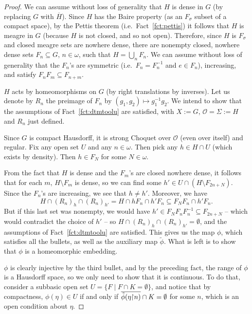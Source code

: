	\begin{proof}
		We can assume without loss of generality that $H$ is dense in $G$ (by replacing $G$ with $\overline H$). Since $H$ has the Baire property (as an $F_\sigma$ subset of a compact space), by the Pettis theorem (i.e.\ Fact~\ref{fct:pettis}) it follows that $H$ is meagre in $G$ (because $H$ is not closed, and so not open). Therefore, since $H$ is $F_\sigma$ and closed meagre sets are nowhere dense, there are nonempty closed, nowhere dense sets $F_n\subseteq G$, $n \in \omega$, such that $H = \bigcup_n F_n$. We can assume without loss of generality that the $F_n$'s are symmetric (i.e.\ $F_n=F_n^{-1}$ and $e \in F_n$), increasing, and satisfy $F_nF_m\subseteq F_{n+m}$.
		
		$H$ acts by homeomorphisms on $G$ (by right translations by inverses). Let us denote by $R_n$ the preimage of $F_n$ by $(g_1,g_2)\mapsto g_1^{-1}g_2$. We intend to show that the assumptions of Fact~\ref{fct:dtmtoolu} are satisfied, with $X:=G$, $\mathcal O=\Sigma:=H$ and $R_n$ just defined.
		
		Since $G$ is compact Hausdorff, it is strong Choquet over $\mathcal O$ (even over itself) and regular. Fix any open set $U$ and any $n\in \omega$. Then pick any $h\in H\cap U$ (which exists by density). Then $h\in F_N$ for some $N\in \omega$.
		
		From the fact that $H$ is dense and the $F_m$'s are closed nowhere dense, it follows that for each $m$, $H\setminus F_m$ is dense, so we can find some $h'\in U\cap (H\setminus F_{2n+N})$. Since the $F_n$'s are increasing, we see that $h \ne h'$.
		Moreover, we have
		\[
		H\cap (R_n)_h\cap (R_n)_{h'}=H\cap hF_n \cap h'F_n \subseteq F_N F_n \cap h' F_n .
		\]
		But if this last set was nonempty, we would have $h'\in F_NF_nF_n^{-1}\subseteq F_{2n+N}$ -- which would contradict the choice of $h'$ -- so $H\cap (R_n)_h\cap(R_n)_{h'}=\emptyset$, and the assumptions of Fact~\ref{fct:dtmtoolu} are satisfied. This gives us the map $\phi$, which satisfies all the bullets, as well as the auxiliary map $\tilde{\phi}$. What is left is to show that $\phi$ is a homeomorphic embedding.
		
		$\phi$ is clearly injective by the third bullet, and by the preceding fact, the range of $\phi$ is a Hausdorff space, so we only need to show that it is continuous. To do that, consider a subbasic open set $U=\{F\mid F\cap K= \emptyset\}$, and notice that by compactness, $\phi(\eta)\in U$ if and only if $\overline{\tilde{\phi}(\eta\mathord{\upharpoonright} n)}\cap K= \emptyset$ for some $n$, which is an open condition about $\eta$.
	\end{proof}
	
